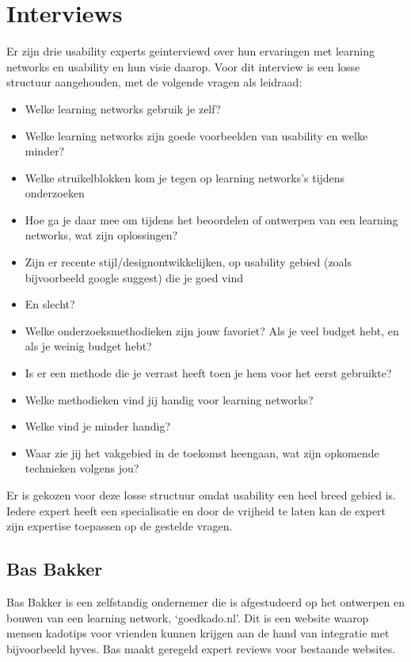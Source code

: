 \chapter{Interviews}
\label{interviewappendix}
Er zijn drie usability experts geinterviewd over hun ervaringen met learning networks en usability en hun visie daarop. Voor dit interview is een losse structuur aangehouden, met de volgende vragen als leidraad:

\begin{itemize}
  \item Welke learning networks gebruik je zelf?
  \item Welke learning networks zijn goede voorbeelden van usability en welke minder?

  \item Welke struikelblokken kom je tegen op learning networks's tijdens onderzoeken
  \item Hoe ga je daar mee om tijdens het beoordelen of ontwerpen van een learning networks, wat zijn oplossingen?

  \item Zijn er recente stijl/designontwikkelijken, op usability gebied (zoals bijvoorbeeld google suggest) die je goed vind
  \item En slecht?

  \item Welke onderzoeksmethodieken zijn jouw favoriet? Als je veel budget hebt, en als je weinig budget hebt?
  \item Is er een methode die je verrast heeft toen je hem voor het eerst gebruikte?

  \item Welke methodieken vind jij handig voor learning networks?
  \item Welke vind je minder handig?

  \item Waar zie jij het vakgebied in de toekomst heengaan, wat zijn opkomende technieken volgens jou?
\end{itemize}

Er is gekozen voor deze losse structuur omdat usability een heel breed gebied is. Iedere expert heeft een specialisatie en door de vrijheid te laten kan de expert zijn expertise toepassen op de gestelde vragen.

\section{Bas Bakker}
Bas Bakker is een zelfstandig ondernemer die is afgestudeerd op het ontwerpen en bouwen van een learning network, `goedkado.nl'. Dit is een website waarop mensen kadotips voor vrienden kunnen krijgen aan de hand van integratie met bijvoorbeeld hyves. Bas maakt geregeld expert reviews voor bestaande websites.

